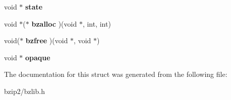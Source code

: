 \begin{DoxyCompactItemize}
\item 
void $\ast$ {\bfseries state}\hypertarget{structbz__stream_a7b976d082aba4d851eea25a308d96ee8}{}\label{structbz__stream_a7b976d082aba4d851eea25a308d96ee8}

\item 
void $\ast$($\ast$ {\bfseries bzalloc} )(void $\ast$, int, int)\hypertarget{structbz__stream_a1c50a6e31e7d6c9724b00e470802df1a}{}\label{structbz__stream_a1c50a6e31e7d6c9724b00e470802df1a}

\item 
void($\ast$ {\bfseries bzfree} )(void $\ast$, void $\ast$)\hypertarget{structbz__stream_a02d0890b69f8f3e07f81ee857e00359c}{}\label{structbz__stream_a02d0890b69f8f3e07f81ee857e00359c}

\item 
void $\ast$ {\bfseries opaque}\hypertarget{structbz__stream_a8e000913c058c83abd1ec96c6aef302a}{}\label{structbz__stream_a8e000913c058c83abd1ec96c6aef302a}

\end{DoxyCompactItemize}


The documentation for this struct was generated from the following file\+:\begin{DoxyCompactItemize}
\item 
bzip2/bzlib.\+h\end{DoxyCompactItemize}
